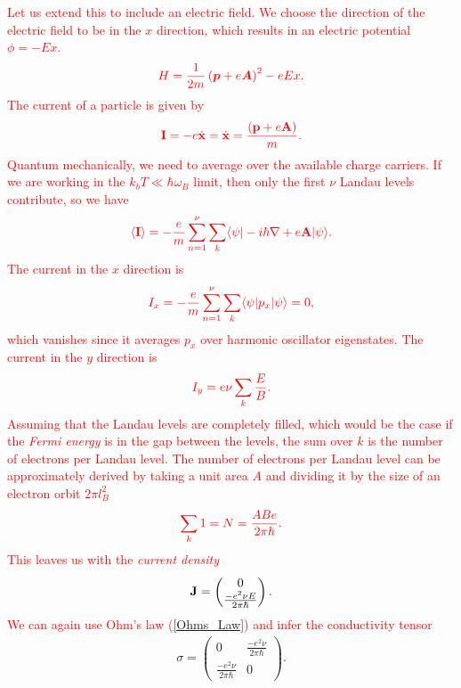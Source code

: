  \textcolor{red}{ Let us extend this to include an electric field. We choose the direction of the electric field to be in the $x$ direction, which results in an electric potential $\phi = -Ex$.}
\begin{align}
    \textcolor{red}{ H=\frac{1}{2m}\left(\bm{p} +e \bm{A} \right)^2 -e Ex.}
\end{align}
 \textcolor{red}{ The current of a particle is given by}
\begin{align}
    \textcolor{red}{ {\bf{I}}=-e\dot{{\bf x}}=  \dot{{\bf x}}= \frac{\left({\bf p}+e{\bf A}\right)}{m}.}
\end{align}
 \textcolor{red}{ Quantum mechanically, we need to average over the available charge carriers. If we are working in the $k_b T \ll \hbar \omega_B$ limit, then only the first $\nu$ Landau levels contribute, so we have}
\begin{align}
    \textcolor{red}{ \langle {\bf I} \rangle = - \frac{e}{m} \sum_{n=1}^{\nu} \sum_{k}  \langle \psi |-i \hbar \nabla +e \bf{A} |\psi \rangle.}
\end{align}
 \textcolor{red}{ The current in the $x$ direction is }
\begin{align}
    \textcolor{red}{ I_x = -\frac{e}{m} \sum_{n=1}^{\nu} \sum_{k} \langle \psi|p_x | \psi \rangle=0,}
\end{align}
 \textcolor{red}{ which vanishes since it averages $p_x$ over harmonic oscillator eigenstates. The current in the $y$ direction is}
\begin{align}
    \textcolor{red}{ I_y = e \nu \sum_{k} \frac{E}{B}.}
\end{align}
 \textcolor{red}{ Assuming that the Landau levels are completely filled, which would be the case if the \textit{Fermi energy} is in the gap between the levels, the sum over $k$ is the number of electrons per Landau level. The number of electrons per Landau level can be approximately derived by taking a unit area $A$ and dividing it by the size of an electron orbit $2 \pi l_B^2$ }
\begin{align}
    \textcolor{red}{ \sum_{k}1 = N = \frac{A B e}{2 \pi \hbar}.}
\end{align}
 \textcolor{red}{ This leaves us with the \textit{current density}}
\begin{align}
    {\bf J} = \begin{pmatrix} 
0\\
        \frac{-e^2 \nu E}{2 \pi \hbar}
    \end{pmatrix}.
\end{align}
 \textcolor{red}{ We can again use Ohm's law (\ref{Ohms_Law}) and infer the conductivity tensor}
\begin{align}
    \sigma = \begin{pmatrix}
        0&\frac{- e^2 \nu }{2\pi \hbar}\\
        \frac{- e^2 \nu }{2\pi \hbar}&0
    \end{pmatrix}.
\end{align}

